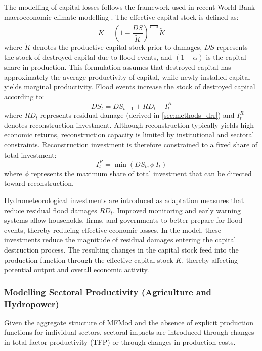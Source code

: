 \documentclass[
  final,
  10pt,
  letterpaper,
  english,
]{article}
\begin{document}
The modelling of capital losses follows the framework used in recent World Bank
macroeconomic climate modelling
\parencite{burns2021climate,hallegatte2024modeling}. The effective capital stock
is defined as:
\begin{equation}
  K=\left(1 -\frac{DS}{\widetilde{K}}\right)^{\frac{1}{1-\alpha}}\widetilde{K}
\end{equation}
where $\widetilde{K}$ denotes the productive capital stock prior to damages,
$DS$ represents the stock of destroyed capital due to flood events, and
$(1-\alpha)$ is the capital share in production. This formulation assumes that
destroyed capital has approximately the average productivity of capital, while
newly installed capital yields marginal productivity. Flood events increase the
stock of destroyed capital according to:
\begin{equation}
  DS_t = DS_{t-1} + RD_t - I_t^R
  \label{eq:drr_link_equation}
\end{equation}
where $RD_t$ represents residual damage (derived in \cref{sec:methods_drr}) and
$I_t^R$ denotes reconstruction investment. Although reconstruction typically
yields high economic returns, reconstruction capacity is limited by
institutional and sectoral constraints. Reconstruction investment is therefore
constrained to a fixed share of total investment:
\begin{equation}
  I_t^R = \min (DS_t, \phi\,I_t)
\end{equation}
where $\phi$ represents the maximum share of total investment that can be directed
toward reconstruction.

Hydrometeorological investments are introduced as adaptation measures that
reduce residual flood damages $RD_t$. Improved monitoring and early warning
systems allow households, firms, and governments to better prepare for flood
events, thereby reducing effective economic losses. In the model, these
investments reduce the magnitude of residual damages entering the capital
destruction process. The resulting changes in the capital stock feed into the
production function through the effective capital stock $K$, thereby affecting
potential output and overall economic activity.

\subsubsection{Modelling Sectoral Productivity (Agriculture and Hydropower)}
\label{sec:methods_mfmod_productivity}

Given the aggregate structure of MFMod and the absence of explicit production
functions for individual sectors, sectoral impacts are introduced through
changes in total factor productivity (TFP) or through changes in production
costs. 
\end{document}

